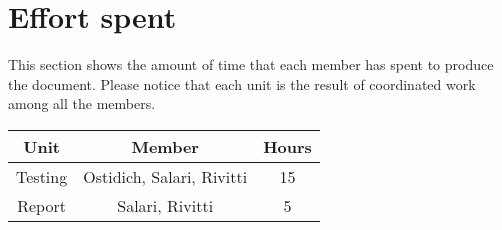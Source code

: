 \chapter{Effort spent}

This section shows the amount of time that each member has spent to produce the document.
Please notice that each unit is the result of coordinated work among all the members.

\begin{table}[h]
    \centering
    \begin{tabular}{|c|c|c|}
        \hline \textbf{Unit} & \textbf{Member} & \textbf{Hours} \\
        \hline Testing & Ostidich, Salari, Rivitti & 15 \\
        \hline Report & Salari, Rivitti & 5 \\
        \hline
    \end{tabular}
\end{table}

